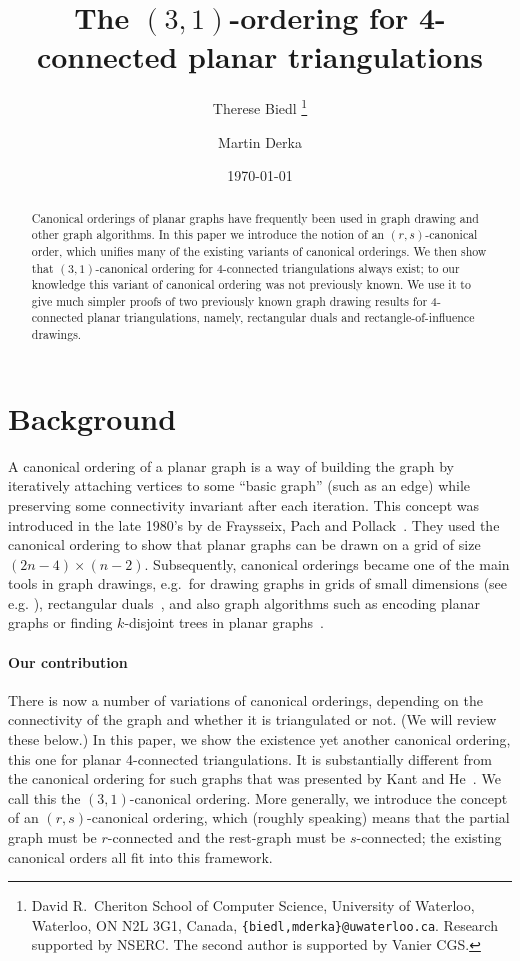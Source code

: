 \documentclass[12pt]{article}
\title{The $(3,1)$-ordering for 4-connected planar triangulations}
\author{Therese Biedl
\thanks{David R.~Cheriton School of Computer Science, 
University of Waterloo, 
Waterloo, ON N2L 3G1, Canada, {\tt \{biedl,mderka\}@uwaterloo.ca}. Research supported by NSERC. The second author is supported by Vanier CGS. }
\and
Martin Derka
\addtocounter{footnote}{-1}
\footnotemark
}
\date{\today}
\begin{document}
\maketitle

\begin{abstract}
Canonical orderings of planar graphs have frequently been used in graph drawing and other graph algorithms. In this paper we introduce the notion of an
$(r,s)$-canonical order, which unifies many of the existing variants of
canonical orderings.  We then show that $(3,1)$-canonical ordering
for 4-connected triangulations always exist; to our knowledge
this variant of canonical ordering was not previously known.
We use it to give much simpler proofs of two previously known graph drawing 
results for 4-connected planar triangulations, namely, rectangular duals 
and rectangle-of-influence drawings.
\end{abstract}


\section{Background}
\label{se:intro}


A canonical ordering of a planar graph is a way of building the graph by iteratively attaching vertices to some ``basic graph'' (such as an edge) while preserving some connectivity invariant after each iteration. This concept was introduced in the late 1980's by de Fraysseix, Pach and Pollack~\cite{FPP90}. They used the canonical ordering to show that planar graphs can be drawn on a grid of size $(2n-4) \times (n-2)$. Subsequently, canonical orderings became one of the main tools in graph drawings, e.g.~for drawing graphs in grids of small dimensions (see e.g. \cite{FPP90,CN98}), rectangular duals~\cite{KH97}, and also graph algorithms such as encoding planar graphs \cite{HKL99} or finding $k$-disjoint trees in planar graphs~\cite{NRN97,NN00}. 


\paragraph{Our contribution}
There is now a number of variations of canonical orderings, depending on
the connectivity of the graph and whether it is triangulated or not.  (We
will review these below.)
In this paper, we show the existence yet another canonical ordering, this one  for planar 4-connected triangulations.  It is substantially different from the canonical ordering for such graphs that was presented by Kant and He~\cite{KH97}. 
We call this the $(3,1)$-canonical ordering.  More generally, we introduce
the concept of an $(r,s)$-canonical ordering, which (roughly speaking) means
that the partial graph must be $r$-connected and the rest-graph must be
$s$-connected; the existing canonical orders all fit into this framework.
\end{document}
